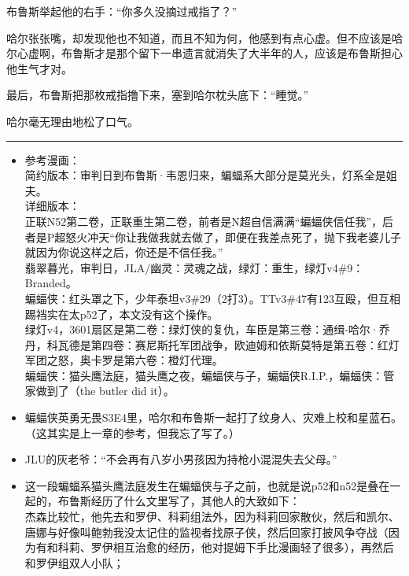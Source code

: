 \documentclass[../main]{subfiles}
\begin{document}
布鲁斯举起他的右手：“你多久没摘过戒指了？”

哈尔张张嘴，却发现他也不知道，而且不知为何，他感到有点心虚。但不应该是哈尔心虚啊，布鲁斯才是那个留下一串遗言就消失了大半年的人，应该是布鲁斯担心他生气才对。

最后，布鲁斯把那枚戒指撸下来，塞到哈尔枕头底下：“睡觉。”

哈尔毫无理由地松了口气。

\begin{center}\rule{0.5\linewidth}{0.5pt}\end{center}

\begin{itemize}
    \item
          参考漫画：\\
          简约版本：审判日到布鲁斯·韦恩归来，蝙蝠系大部分是莫光头，灯系全是姐夫。\\
          详细版本：\\
          正联N52第二卷，正联重生第二卷，前者是N超自信满满“蝙蝠侠信任我”，后者是P超怒火冲天“你让我做我就去做了，即便在我差点死了，抛下我老婆儿子就因为你说这样之后，你还是不信任我。”\\
          翡翠暮光，审判日，JLA/幽灵：灵魂之战，绿灯：重生，绿灯v4\#9：Branded。\\
          蝙蝠侠：红头罩之下，少年泰坦v3\#29（2打3）。TTv3\#47有123互殴，但互相踢裆实在太p52了，本文没有这个操作。\\
          绿灯v4，3601扇区是第二卷：绿灯侠的复仇，车臣是第三卷：通缉-哈尔·乔丹，科瓦德是第四卷：赛尼斯托军团战争，欧迪姆和依斯莫特是第五卷：红灯军团之怒，奥卡罗是第六卷：橙灯代理。\\
          蝙蝠侠：猫头鹰法庭，猫头鹰之夜，蝙蝠侠与子，蝙蝠侠R.I.P.，蝙蝠侠：管家做到了（the
          butler did it）。
    \item
          蝙蝠侠英勇无畏S3E4里，哈尔和布鲁斯一起打了纹身人、灾难上校和星蓝石。（这其实是上一章的参考，但我忘了写了。）
    \item
          JLU的灰老爷：“不会再有八岁小男孩因为持枪小混混失去父母。”
    \item
          这一段蝙蝠系猫头鹰法庭发生在蝙蝠侠与子之前，也就是说p52和n52是叠在一起的，布鲁斯经历了什么文里写了，其他人的大致如下：\\
          杰森比较忙，他先去和罗伊、科莉组法外，因为科莉回家散伙，然后和凯尔、唐娜与好像叫鲍勃我没太记住的监视者找原子侠，然后回家打披风争夺战（因为有和科莉、罗伊相互治愈的经历，他对提姆下手比漫画轻了很多），再然后和罗伊组双人小队；\\

\end{itemize}
\end{document}
